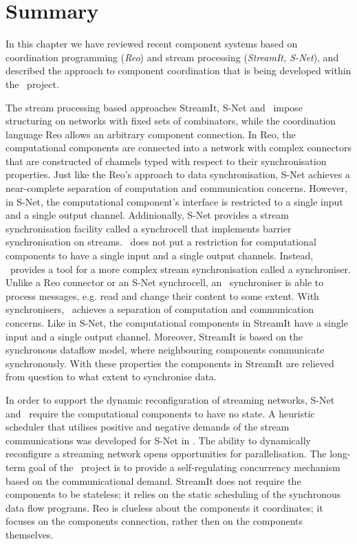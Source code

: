     \section{Summary}
In this chapter we have reviewed recent component systems based on coordination programming (\emph{Reo}) and stream processing (\emph{StreamIt, S-Net}), and described the approach to component coordination that is being developed within the \ak\ project.

The stream processing based approaches StreamIt, S-Net and \ak\ impose structuring on networks with fixed sets of combinators, while the coordination language Reo allows an arbitrary component connection. In Reo, the computational components are connected into a network with complex connectors that are constructed of channels typed with respect to their synchronisation properties. Just like the Reo's approach to data synchronisation, S-Net achieves a near-complete separation of computation and communication concerns. However, in S-Net, the computational component's interface is restricted to a single input and a single output channel. Addinionally, S-Net provides a stream synchronisation facility called a synchrocell that implements barrier synchronisation on streams. \ak\ does not put a restriction for computational components to have a single input and a single output channels. Instead, \ak\ provides a tool for a more complex stream synchronisation called a synchroniser. Unlike a Reo connector or an S-Net synchrocell, an \ak\ synchroniser is able to process messages, e.g. read and change their content to some extent. With synchronisers, \ak\ achieves a separation of computation and communication concerns. Like in S-Net, the computational components in StreamIt have a single input and a single output channel. Moreover, StreamIt is based on the synchronous dataflow model, where neighbouring components communicate synchronously. With these properties the components in StreamIt are relieved from question to what extent to synchronise data.

In order to support the dynamic reconfiguration of streaming networks, S-Net and \ak\ require the computational components to have no state. A heuristic scheduler that utilises positive and negative demands of the stream communications was developed for S-Net in \cite{nga}. The ability to dynamically reconfigure a streaming network opens opportunities for parallelisation. The long-term goal of the \ak\ project is to provide a self-regulating concurrency mechanism based on the communicational demand. StreamIt does not require the components to be stateless; it relies on the static scheduling of the synchronous data flow programs. Reo is clueless about the components it coordinates; it focuses on the components connection, rather then on the components themselves.
%
%
